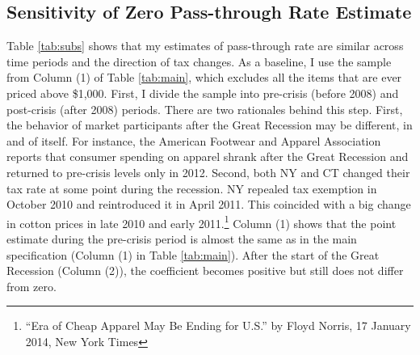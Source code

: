 \documentclass[12pt]{article}
\begin{document}
	
		

	\subsection{Sensitivity of Zero Pass-through Rate Estimate}

	
	
	Table \ref{tab:subs} shows that my estimates of pass-through rate are similar across time periods and the direction of tax changes. As a baseline, I use the sample from Column (1) of Table \ref{tab:main}, which excludes all the items that are ever priced above \$1,000. First, I divide the sample into pre-crisis (before 2008) and post-crisis (after 2008) periods. There are two rationales behind this step. First, the behavior of market participants after the Great Recession may be different, in and of itself. For instance, the American Footwear and Apparel Association reports that consumer spending on apparel shrank after the Great Recession and returned to pre-crisis levels only in 2012. Second, both NY and CT changed their tax rate at some point during the recession. NY repealed tax exemption in October 2010 and reintroduced it in April 2011. This coincided with a big change in cotton prices in late 2010 and early 2011.\footnote{``Era of Cheap Apparel May Be Ending for U.S.'' by Floyd Norris, 17 January 2014, New York Times} %
	Column (1) shows that the point estimate during the pre-crisis period is almost the same as in the main specification (Column (1) in Table \ref{tab:main}). After the start of the Great Recession (Column (2)), the coefficient becomes positive but still does not differ from zero.
\end{document}
